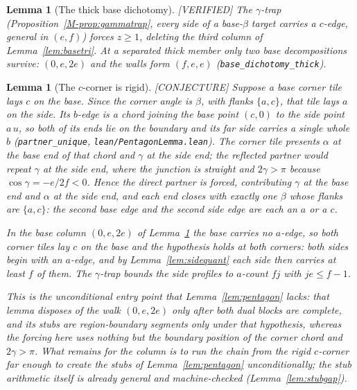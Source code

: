 \documentclass[11pt,reqno]{amsart}
\theoremstyle{plain}
\newtheorem{lemma}[theorem]{Lemma}
\theoremstyle{definition}
\newcommand{\lab}[1]{\hfill\textnormal{\footnotesize\textsc{[#1]}}}
\begin{document}
\begin{lemma}[The thick base dichotomy]\label{lem:basedi}\lab{VERIFIED}
The $\gamma$-trap (Proposition~\ref{M-prop:gammatrap}, every side of a base-$\beta$ target carries
a $c$-edge, general in $(e,f)$) forces $z\ge1$, deleting the third column of
Lemma~\ref{lem:basetri}. At a separated thick member only two base decompositions survive:
$(0,e,2e)$ and the walls form $(f,e,e)$ (\texttt{base\_dichotomy\_thick}).
\end{lemma}

\begin{lemma}[The $c$-corner is rigid]\label{lem:ccorner}\lab{CONJECTURE}
Suppose a base corner tile lays $c$ on the base. Since the corner angle is $\beta$, with flanks
$\{a,c\}$, that tile lays $a$ on the side. Its $b$-edge is a chord joining the base point $(c,0)$
to the side point $a\,u$, so both of its ends lie on the boundary and its far side carries a
single whole $b$ (\texttt{partner\_unique}, \texttt{lean/PentagonLemma.lean}). The corner tile presents $\alpha$ at the base end of
that chord and $\gamma$ at the side end; the reflected partner would repeat $\gamma$ at the side
end, where the junction is straight and $2\gamma>\pi$ because $\cos\gamma=-e/2f<0$. Hence the
direct partner is forced, contributing $\gamma$ at the base end and $\alpha$ at the side end, and
each end closes with exactly one $\beta$ whose flanks are $\{a,c\}$: the second base edge and the
second side edge are each an $a$ or a $c$.

In the base column $(0,e,2e)$ of Lemma~\ref{lem:basedi} the base carries no $a$-edge, so both
corner tiles lay $c$ on the base and the hypothesis holds at both corners: both sides begin with
an $a$-edge, and by Lemma~\ref{lem:sidequant} each side then carries at least $f$ of them. The
$\gamma$-trap bounds the side profiles to $a$-count $fj$ with $je\le f-1$.

This is the unconditional entry point that Lemma~\ref{lem:pentagon} lacks: that lemma disposes of
the walk $(0,e,2e)$ only after both dual blocks are complete, and its stubs are region-boundary
segments only under that hypothesis, whereas the forcing here uses nothing but the boundary
position of the corner chord and $2\gamma>\pi$. What remains for the column is to run the chain
from the rigid $c$-corner far enough to create the stubs of Lemma~\ref{lem:pentagon}
unconditionally; the stub arithmetic itself is already general and machine-checked
(Lemma~\ref{lem:stubgap}).
\end{lemma}
\end{document}
